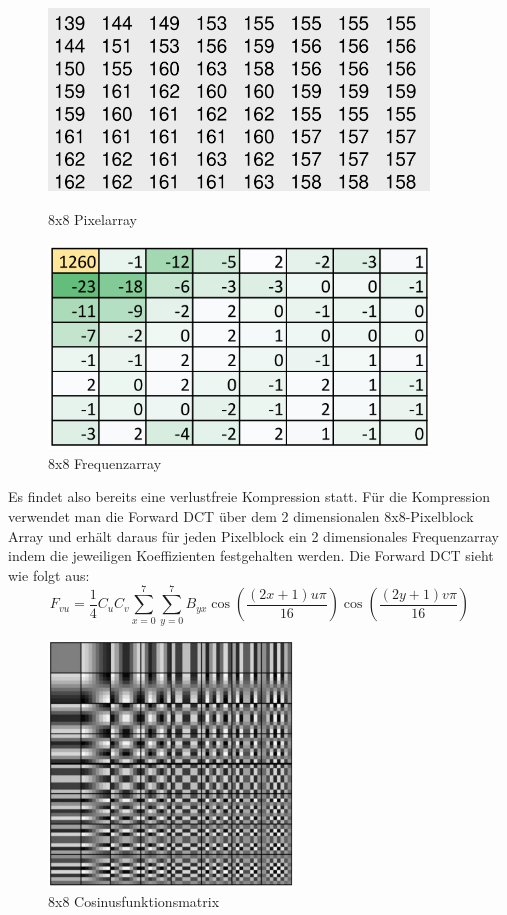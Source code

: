 \documentclass{article}
\begin{document}
\begin{figure}[h]
    \centering
    \begin{minipage}{0.45\textwidth}
        \centering
        \includegraphics[width=0.9\textwidth]{img/8x8_array.png} 
        \caption{8x8 Pixelarray}
    \end{minipage}\hfill
    \begin{minipage}{0.45\textwidth}
        \centering
        \includegraphics[width=0.9\textwidth]{img/dct_result.png} 
        \caption{8x8 Frequenzarray}
    \end{minipage}
\end{figure}

Es findet also bereits eine verlustfreie Kompression statt. Für die Kompression verwendet man die Forward DCT über dem 2 dimensionalen 8x8-Pixelblock Array und erhält daraus für jeden Pixelblock ein 2 dimensionales Frequenzarray indem die jeweiligen Koeffizienten festgehalten werden. Die Forward DCT sieht wie folgt aus:
$$F_{vu} = \frac{1}{4} C_u C_v \sum_{x=0}^7 \sum_{y=0}^7 B_{yx} \cos \left( \frac{(2x+1)u\pi}{16} \right) \cos \left( \frac{(2y+1)v\pi}{16} \right)$$
\begin{figure}[h]
		\begin{center}
		\includegraphics[width=6.5cm]{img/dct.png}
		\end{center}
		\caption{8x8 Cosinusfunktionsmatrix}
		\label{fig:8x8 Cosinusfunktionsmatrix}
\end{figure}
\newpage
\end{document}
